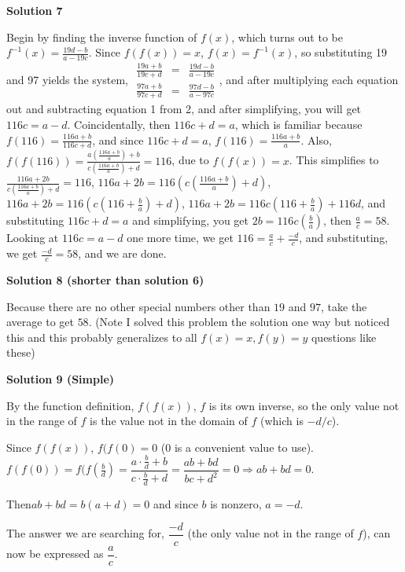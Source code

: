 \begin{enumerate}
 



\textbf{Solution 7}

Begin by finding the inverse function of $f(x)$, which turns out to be $f^{-1}(x)=\frac{19d-b}{a-19c}$. Since $f(f(x))=x$, $f(x)=f^{-1}(x)$, so substituting 19 and 97 yields the system, $\begin{array}{lcl} \frac{19a+b}{19c+d} & = & \frac{19d-b}{a-19c} \\ \frac{97a+b}{97c+d} & = & \frac{97d-b}{a-97c} \end{array}$, and after multiplying each equation out and subtracting equation 1 from 2, and after simplifying, you will get $116c=a-d$. Coincidentally, then $116c+d=a$, which is familiar because $f(116)=\frac{116a+b}{116c+d}$, and since $116c+d=a$, $f(116)=\frac{116a+b}{a}$. Also, $f(f(116))=\frac{a(\frac{116a+b}{a})+b}{c(\frac{116a+b}{a})+d}=116$, due to $f(f(x))=x$. This simplifies to $\frac{116a+2b}{c(\frac{116a+b}{a})+d}=116$, $116a+2b=116(c(\frac{116a+b}{a})+d)$, $116a+2b=116(c(116+\frac{b}{a})+d)$, $116a+2b=116c(116+\frac{b}{a})+116d$, and substituting $116c+d=a$ and simplifying, you get $2b=116c(\frac{b}{a})$, then $\frac{a}{c}=58$. Looking at $116c=a-d$ one more time, we get $116=\frac{a}{c}+\frac{-d}{c}$, and substituting, we get $\frac{-d}{c}=\boxed{58}$, and we are done.

 



\textbf{Solution 8 (shorter than solution 6)}

Because there are no other special numbers other than $19$ and $97$, take the average to get $\boxed{58}$. (Note I solved this problem the solution one way but noticed this and this probably generalizes to all $f(x)=x, f(y)=y$ questions like these)

 



\textbf{Solution 9 (Simple)}

By the function definition, $f(f(x))$, $f$ is its own inverse, so the only value not in the range of $f$ is the value not in the domain of $f$ (which is $-d/c$). 

 Since $f(f(x))$, $f(f(0)=0$ (0 is a convenient value to use). $f(f(0))=f(f(\frac{b}{d})=\dfrac{a\cdot\frac{b}{d}+b}{c\cdot\frac{b}{d}+d}=\dfrac{ab+bd}{bc+d^2}=0 \Rightarrow ab+bd=0$.

 Then$ab+bd=b(a+d)=0$ and since $b$ is nonzero, $a=-d$. 

 The answer we are searching for, $\dfrac{-d}{c}$ (the only value not in the range of $f$), can now be expressed as $\dfrac{a}{c}$.


\end{enumerate}
